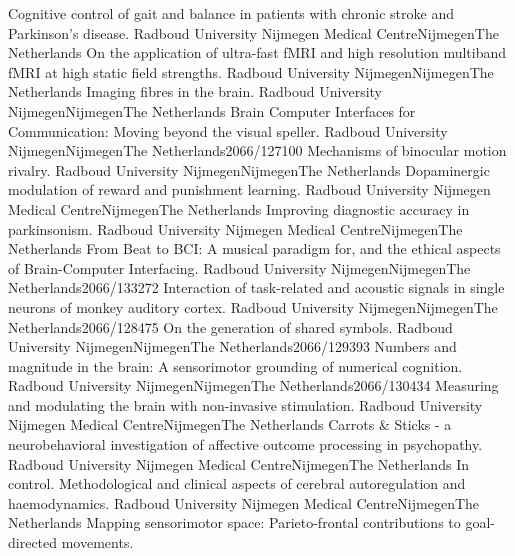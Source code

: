 	{ Cognitive control of gait and balance in patients with chronic stroke and Parkinson's disease.}
	{Radboud University Nijmegen Medical Centre}{Nijmegen}{The Netherlands}{}
	{On the application of ultra-fast fMRI and high resolution multiband fMRI at high static field strengths.}
	{Radboud University Nijmegen}{Nijmegen}{The Netherlands}{}
	{Imaging fibres in the brain.}
	{Radboud University Nijmegen}{Nijmegen}{The Netherlands}{}
	{Brain Computer Interfaces for Communication: Moving beyond the visual speller.}
	{Radboud University Nijmegen}{Nijmegen}{The Netherlands}{2066/127100}
	{Mechanisms of binocular motion rivalry.}
	{Radboud University Nijmegen}{Nijmegen}{The Netherlands}{}
	{Dopaminergic modulation of reward and punishment learning.}
	{Radboud University Nijmegen Medical Centre}{Nijmegen}{The Netherlands}{}
	{Improving diagnostic accuracy in parkinsonism.}
	{Radboud University Nijmegen Medical Centre}{Nijmegen}{The Netherlands}{}
	{From Beat to BCI: A musical paradigm for, and the ethical aspects of Brain-Computer Interfacing.}
	{Radboud University Nijmegen}{Nijmegen}{The Netherlands}{2066/133272}
	{Interaction of task-related and acoustic signals in single neurons of monkey auditory cortex.}
	{Radboud University Nijmegen}{Nijmegen}{The Netherlands}{2066/128475}
	{On the generation of shared symbols.}
	{Radboud University Nijmegen}{Nijmegen}{The Netherlands}{2066/129393}
	{Numbers and magnitude in the brain: A sensorimotor grounding of numerical cognition.}
	{Radboud University Nijmegen}{Nijmegen}{The Netherlands}{2066/130434}
	{Measuring and modulating the brain with non-invasive stimulation.}
	{Radboud University Nijmegen Medical Centre}{Nijmegen}{The Netherlands}{}
	{Carrots & Sticks - a neurobehavioral investigation of affective outcome processing in psychopathy.}
	{Radboud University Nijmegen Medical Centre}{Nijmegen}{The Netherlands}{}
	{In control. Methodological and clinical aspects of cerebral autoregulation and haemodynamics.}
	{Radboud University Nijmegen Medical Centre}{Nijmegen}{The Netherlands}{}
	{Mapping sensorimotor space: Parieto-frontal contributions to goal-directed movements.}
